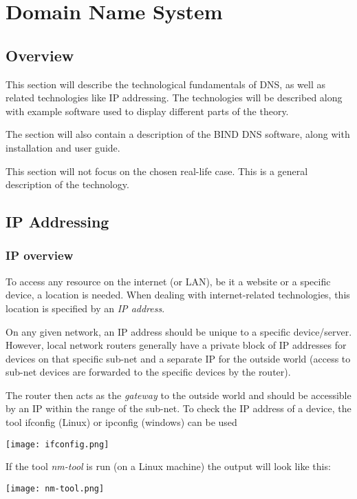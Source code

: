 \chapter{Domain Name System}
\section{Overview}
This section will describe the technological fundamentals of DNS, as well as related technologies like IP addressing. The technologies will be described along with example software used to display different parts of the theory.

The section will also contain a description of the BIND DNS software, along with installation and user guide. 

This section will not focus on the chosen real-life case. This is a general description of the technology.
\section{IP Addressing}
\subsection{IP overview}
To access any resource on the internet (or LAN), be it a website or a specific device, a location is needed. When dealing with internet-related technologies, this location is specified by an \textit{IP address}. 

On any given network, an IP address should be unique to a specific device/server. However, local network routers generally have a private block of IP addresses for devices on that specific sub-net and a separate IP for the outside world (access to sub-net devices are forwarded to the specific devices by the router).

The router then acts as the \textit{gateway} to the outside world and should be accessible by an IP within the range of the sub-net.
To check the IP address of a device, the tool ifconfig (Linux) or ipconfig (windows) can be used 

\begin{center}
	\texttt{[image: ifconfig.png]}
\end{center}

If the tool \textit{nm-tool} is run (on a Linux machine) the output will look like this:

\begin{center}
	\texttt{[image: nm-tool.png]}
\end{center}

